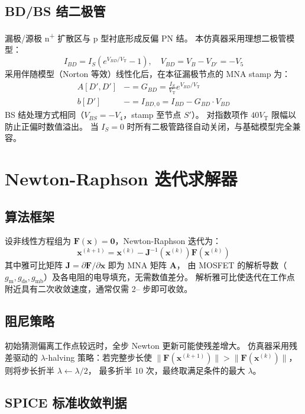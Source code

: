 \documentclass[12pt, a4paper]{article}
\newcommand{\gm}{g_{\mathrm{m}}}
\newcommand{\gds}{g_{\mathrm{ds}}}
\newcommand{\gmb}{g_{\mathrm{mb}}}
\newcommand{\vT}{V_{\mathrm{T}}}
\begin{document}
\subsection{BD/BS 结二极管}
\label{sec:diode}

漏极/源极 n\textsuperscript{+} 扩散区与 p 型衬底形成反偏 PN 结。
本仿真器采用理想二极管模型：
\[
  I_{BD} = I_S\!\left(e^{V_{BD}/\vT} - 1\right),\quad
  V_{BD} = V_B - V_{D'} = -V_5
\]
采用伴随模型（Norton 等效）线性化后，在本征漏极节点的 MNA stamp 为：
\begin{align}
  A[D',D'] &\mathrel{-}= G_{BD} = \frac{I_S}{\vT}e^{V_{BD}/\vT} \\
  b[D'] &\mathrel{-}= I_{BD,0} = I_{BD} - G_{BD}\cdot V_{BD}
\end{align}
BS 结处理方式相同（$V_{BS}=-V_4$，stamp 至节点 $S'$）。
对指数项作 $40\vT$ 限幅以防止正偏时数值溢出。
当 $I_S=0$ 时所有二极管路径自动关闭，与基础模型完全兼容。

\section{Newton-Raphson 迭代求解器}

\subsection{算法框架}

设非线性方程组为 $\bm{F}(\bm{x})=\bm{0}$，Newton-Raphson 迭代为：
\[
  \bm{x}^{(k+1)} = \bm{x}^{(k)} - \bm{J}^{-1}\!\left(\bm{x}^{(k)}\right)\bm{F}\!\left(\bm{x}^{(k)}\right)
\]
其中雅可比矩阵 $\bm{J}=\partial\bm{F}/\partial\bm{x}$ 即为 MNA 矩阵 $\bm{A}$，
由 MOSFET 的解析导数（$\gm,\gds,\gmb$）及各电阻的电导填充，无需数值差分。
解析雅可比使迭代在工作点附近具有二次收敛速度，通常仅需 2\;-- 步即可收敛。

\subsection{阻尼策略}

初始猜测偏离工作点较远时，全步 Newton 更新可能使残差增大。
仿真器采用残差驱动的 $\lambda$-halving 策略：若完整步长使
$\|\bm{F}(\bm{x}^{(k+1)})\| > \|\bm{F}(\bm{x}^{(k)})\|$，
则将步长折半 $\lambda \leftarrow \lambda/2$，
最多折半 10 次，最终取满足条件的最大 $\lambda$。

\subsection{SPICE 标准收敛判据}
\end{document}
